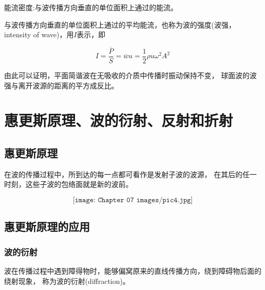 \documentclass[
	12pt, %
	a4paper, %
]{myLegrandOrangeBook}
\begin{document}
\begin{definition}[能流密度]
    能流密度:与波传播方向垂直的单位面积上通过的能流。
\end{definition}

    \begin{definition}
    与波传播方向垂直的单位面积上通过的平均能流，也称为波的强度(波强，intensity of wave)，用\(I \)表示，即

    \begin{equation}
        I=\frac{\overline{P}}{S}=\overline{w} u=\frac{1}{2} \rho u \omega^2 A^2
    \end{equation}
    \end{definition}

    由此可以证明，平面简谐波在无吸收的介质中传播时振动保持不变，
    球面波的波强与离开波源的距离的平方成反比。

\section{惠更斯原理、波的衍射、反射和折射}

\subsection{惠更斯原理}

    在波的传播过程中，所到达的每一点都可看作是发射子波的波源，
    在其后的任一时刻，这些子波的包络面就是新的波前。

    \[
        \texttt{[image: Chapter 07 images/pic4.jpg]}
    \]

\subsection{惠更斯原理的应用}

\subsubsection{波的衍射}

    波在传播过程中遇到障得物时，能够偏窝原来的直线传播方向，绕到障碍物后面的绕射现象，
    称为波的衍射(diffraction)。

    \begin{figure}[!htbp]
        \centering  %
    \end{figure}
    
\end{document}
